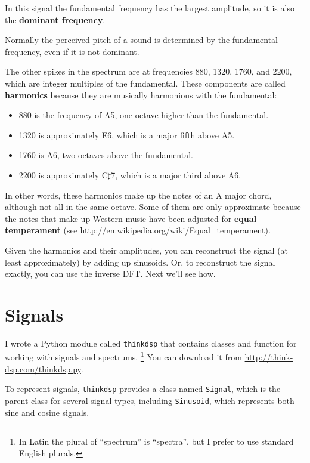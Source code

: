 \documentclass[12pt]{book}
\begin{document}
In this signal the fundamental frequency has the largest amplitude,
so it is also the {\bf dominant frequency}.

Normally the perceived pitch of a sound is determined by the
fundamental frequency, even if it is not dominant. 

The other spikes in the spectrum are at frequencies 880, 1320, 1760, and
2200, which are integer multiples of the fundamental.
These components are called {\bf harmonics} because they are
musically harmonious with the fundamental:

\begin{itemize}

\item 880 is the frequency of
A5, one octave higher than the fundamental.  

\item 1320 is approximately E6, which is a major fifth above A5.

\item 1760 is A6, two octaves above the fundamental. 

\item 2200 is approximately C$\sharp$7, which is a major third
above A6.

\end{itemize}

In other words, these harmonics make up the notes of an A major
chord, although not all in the same octave.  Some of them are only
approximate because the notes that make up Western music have been
adjusted for {\bf equal temperament} (see
 \url{http://en.wikipedia.org/wiki/Equal_temperament}).

Given the harmonics and their amplitudes, you can reconstruct the
signal (at least approximately) by adding up sinusoids.  Or, to
reconstruct the signal exactly, you can use the inverse DFT.  
Next we'll see how.


\section{Signals}

I wrote a Python module called {\tt thinkdsp} that contains
classes and function for working with signals and spectrums.
\footnote{In Latin the plural of ``spectrum'' is ``spectra'', but I
prefer to use standard English plurals.}  You can download
it from \url{http://think-dsp.com/thinkdsp.py}.

To represent signals, {\tt thinkdsp} provides a class named
{\tt Signal}, which is the parent class for several signal types,
including {\tt Sinusoid}, which represents both sine and cosine
signals.
\end{document}
